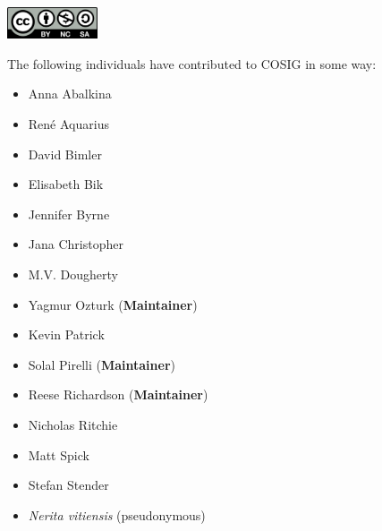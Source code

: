 \documentclass[letterpaper, 12pt]{article}
\begin{document}
\includegraphics[width=0.2\textwidth]{img/home/Cc-by-nc-sa_icon.svg.png}

\pagebreak

The following individuals have contributed to COSIG in some way:

\begin{itemize}
    \setlength\itemsep{-0.5em}
    \item Anna Abalkina 
    \item Ren\'e Aquarius 
    \item David Bimler 
    \item Elisabeth Bik 
    \item Jennifer Byrne 
    \item Jana Christopher 
    \item M.V. Dougherty 
    \item Yagmur Ozturk  (\textbf{Maintainer})
    \item Kevin Patrick 
    \item Solal Pirelli  (\textbf{Maintainer})
    \item Reese Richardson  (\textbf{Maintainer})
    \item Nicholas Ritchie 
    \item Matt Spick 
    \item Stefan Stender 
    \item \textit{Nerita vitiensis} (pseudonymous)
\end{itemize}
\end{document}
